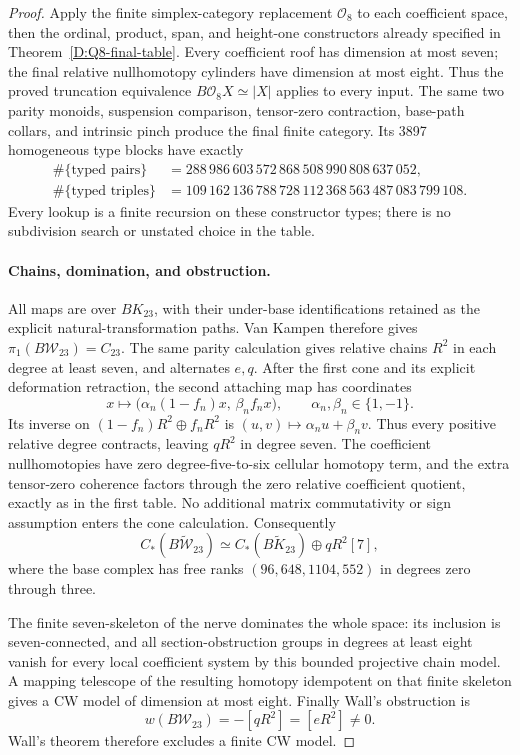 \begin{proof}
Apply the finite simplex-category replacement $\mathcal O_8$ to
each coefficient space, then the ordinal, product, span, and
height-one constructors already specified in
Theorem~\ref{D:Q8-final-table}. Every coefficient roof has dimension
at most seven; the final relative nullhomotopy cylinders have
dimension at most eight. Thus the proved truncation equivalence
$B\mathcal O_8X\simeq|X|$ applies to every input. The same two
parity monoids, suspension comparison, tensor-zero contraction,
base-path collars, and intrinsic pinch produce the final finite
category. Its 3897 homogeneous type blocks have exactly
\[
\begin{split}
 \#\{\text{typed pairs}\}
  &=288\,986\,603\,572\,868\,508\,990\,808\,637\,052,\\
 \#\{\text{typed triples}\}
  &=109\,162\,136\,788\,728\,112\,368\,563\,487\,083\,799\,108.
\end{split}
\]
Every lookup is a finite recursion on these constructor types;
there is no subdivision search or unstated choice in the table.

\paragraph{Chains, domination, and obstruction.}
All maps are over $BK_{23}$, with their under-base identifications
retained as the explicit natural-transformation paths. Van Kampen
therefore gives $\pi_1(B\mathcal W_{23})=C_{23}$. The same parity
calculation gives relative chains $R^2$ in each degree at least
seven, and alternates $e,q$. After the first cone and its explicit
deformation retraction, the second attaching map has coordinates
\[
 x\longmapsto\bigl(\alpha_n(1-f_n)x,\,\beta_nf_nx\bigr),
 \qquad \alpha_n,\beta_n\in\{1,-1\}.
\]
Its inverse on $(1-f_n)R^2\oplus f_nR^2$ is
$(u,v)\mapsto\alpha_nu+\beta_nv$. Thus every positive relative
degree contracts, leaving $qR^2$ in degree seven. The coefficient
nullhomotopies have zero degree-five-to-six cellular homotopy
term, and the extra tensor-zero coherence factors through the
zero relative coefficient quotient, exactly as in the first
table. No additional matrix commutativity or sign assumption
enters the cone calculation.
Consequently
\[
 C_*(\widetilde{B\mathcal W_{23}})\simeq
 C_*(\widetilde{BK_{23}})\oplus qR^2[7],
\]
where the base complex has free ranks $(96,648,1104,552)$ in
degrees zero through three.

The finite seven-skeleton of the nerve dominates the whole space:
its inclusion is seven-connected, and all section-obstruction
groups in degrees at least eight vanish for every local coefficient
system by this bounded projective chain model. A mapping telescope
of the resulting homotopy idempotent on that finite skeleton gives
a CW model of dimension at most eight. Finally Wall's obstruction
is
\[
 w(B\mathcal W_{23})=-[qR^2]=[eR^2]\ne0.
\]
Wall's theorem therefore excludes a finite CW model.


\end{proof}
